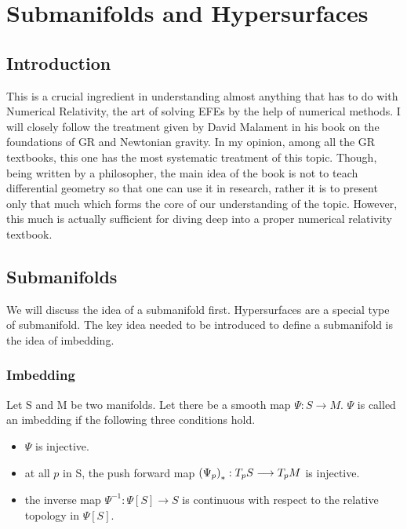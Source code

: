 \chapter{Submanifolds and Hypersurfaces}
\label{ch:hypersurface}

\section{Introduction}

This is a crucial ingredient in understanding almost anything that has to do with Numerical Relativity, the art of solving EFEs by the help of numerical methods. I will closely follow the treatment given by David Malament in his book on the foundations of GR and Newtonian gravity. In my opinion, among all the GR textbooks, this one has the most systematic treatment of this topic. Though, being written by a philosopher, the main idea of the book is not to teach differential geometry so that one can use it in research, rather it is to present only that much which forms the core of our understanding of the topic. However, this much is actually sufficient for diving deep into a proper numerical relativity textbook.



\section{Submanifolds}

We will discuss the idea of a submanifold first. Hypersurfaces are a special type of submanifold. The key idea needed to be introduced to define a submanifold is the idea of imbedding. 
\subsection{Imbedding}

 Let S and M be two manifolds. Let there be a smooth map $\Psi:S \longrightarrow M $. $\Psi$ is called an imbedding if the following three conditions hold.
 \begin{itemize}
     \item $\Psi$ is injective.
     \item at all $p$ in S, the push forward map $\left( \Psi_p \right)_*: T_p S \longrightarrow T_pM$ is injective.
     \item the inverse map $\Psi^{-1}: \Psi \left[ S \right] \longrightarrow S$ is continuous with respect to the relative topology in $\Psi\left[S \right]$.
 \end{itemize}


